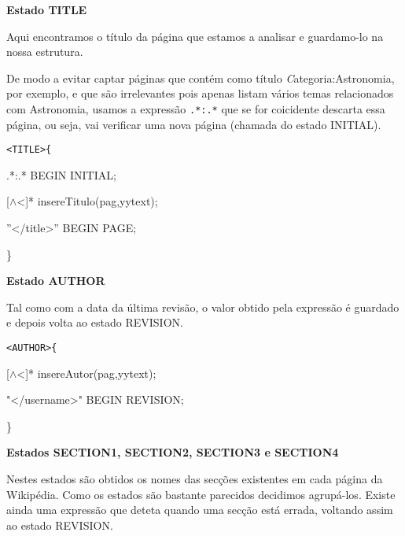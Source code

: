\documentclass[12pt,letterpaper]{article}
\begin{document}
{\bf Estado TITLE}

\par Aqui encontramos o título da página que estamos a analisar e guardamo-lo na nossa estrutura. 

\par De modo a evitar captar páginas que contém como título {\emph Categoria:Astronomia}, por exemplo, e que são irrelevantes pois apenas listam vários temas relacionados com Astronomia, usamos a expressão {\tt .*:.*} que se for coicidente descarta essa página, ou seja, vai verificar uma nova página (chamada do estado INITIAL).\\

{\tt <TITLE>\{ \par
\hspace{1cm}	.*:.*	\hspace{2.0cm} BEGIN INITIAL; \par
\hspace{1cm}	[$ \wedge $<]*	\hspace{1.95cm} insereTitulo(pag,yytext); \par
\hspace{1cm}	''</title>'' 	\hspace{1.0cm} BEGIN PAGE; \par
\}\\}
  



{\bf Estado AUTHOR}
\par Tal como com a data da última revisão, o valor obtido pela expressão é guardado e depois volta ao estado REVISION.\\

{\tt <AUTHOR>\{ \par
\hspace{1cm}	[$ \wedge $<]*	\hspace{1.8cm}		insereAutor(pag,yytext); \par
\hspace{1cm}	"</username>"	\hspace{0.8cm}BEGIN REVISION; \par
\}\\}



{\bf Estados SECTION1, SECTION2, SECTION3 e SECTION4}

\par Nestes estados são obtidos os nomes das secções existentes em cada página da Wikipédia. Como os estados são bastante parecidos decidimos agrupá-los. Existe ainda uma expressão que deteta quando uma secção está errada, voltando assim ao estado REVISION. 
\end{document}

